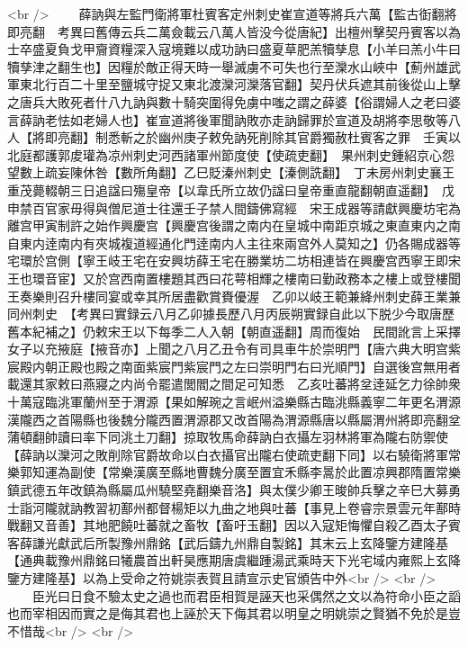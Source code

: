 <br />
　　薛訥與左監門衛將軍杜賓客定州刺史崔宣道等將兵六萬【監古衘翻將即亮翻　考異曰舊傳云兵二萬僉載云八萬人皆没今從唐紀】出檀州擊契丹賓客以為士卒盛夏負戈甲齎資糧深入寇境難以成功訥曰盛夏草肥羔犢孳息【小羊曰羔小牛曰犢孳津之翻生也】因糧於敵正得天時一舉滅虜不可失也行至灤水山峽中【薊州雄武軍東北行百二十里至鹽城守捉又東北渡灤河灤落官翻】契丹伏兵遮其前後從山上擊之唐兵大敗死者什八九訥與數十騎突圍得免虜中嗤之謂之薛婆【俗謂婦人之老曰婆言薛訥老怯如老婦人也】崔宣道將後軍聞訥敗亦走訥歸罪於宣道及胡將李思敬等八人【將即亮翻】制悉斬之於幽州庚子敕免訥死削除其官爵獨赦杜賓客之罪　壬寅以北庭都護郭䖍瓘為凉州刺史河西諸軍州節度使【使疏吏翻】　果州刺史鍾紹京心怨望數上疏妄陳休咎【數所角翻】乙巳貶溱州刺史【溱側詵翻】　丁未房州刺史襄王重茂薨輟朝三日追諡曰殤皇帝【以韋氏所立故仍諡曰皇帝重直龍翻朝直遥翻】　戊申禁百官家毋得與僧尼道士往還壬子禁人間鑄佛寫經　宋王成器等請獻興慶坊宅為離宫甲寅制許之始作興慶宫【興慶宫後謂之南内在皇城中南距京城之東直東内之南自東内逹南内有夾城複道經通化門逹南内人主往來兩宫外人莫知之】仍各賜成器等宅環於宫側【寧王岐王宅在安興坊薛王宅在勝業坊二坊相連皆在興慶宫西寧王即宋王也環音宦】又於宫西南置樓題其西曰花萼相輝之樓南曰勤政務本之樓上或登樓聞王奏樂則召升樓同宴或幸其所居盡歡賞賚優渥　乙卯以岐王範兼絳州刺史薛王業兼同州刺史　【考異曰實録云八月乙卯據長歷八月丙辰朔實録自此以下脱少今取唐歷舊本紀補之】仍敕宋王以下每季二人入朝【朝直遥翻】周而復始　民間訛言上采擇女子以充掖庭【掖音亦】上聞之八月乙丑令有司具車牛於崇明門【唐六典大明宫紫宸殿内朝正殿也殿之南面紫宸門紫宸門之左曰崇明門右曰光順門】自選後宫無用者載還其家敕曰燕寢之内尚令罷遣閭閻之間足可知悉　乙亥吐蕃將坌逹延乞力徐帥衆十萬寇臨洮軍蘭州至于渭源【果如解琬之言岷州溢樂縣古臨洮縣義寧二年更名渭源漢隴西之首陽縣也後魏分隴西置渭源郡又改首陽為渭源縣唐以縣屬渭州將即亮翻坌蒲頓翻帥讀曰率下同洮土刀翻】掠取牧馬命薛訥白衣攝左羽林將軍為隴右防禦使【薛訥以灤河之敗削除官爵故命以白衣攝官出隴右使疏吏翻下同】以右驍衛將軍常樂郭知運為副使【常樂漢廣至縣地曹魏分廣至置宜禾縣李暠於此置凉興郡隋置常樂鎮武德五年改鎮為縣屬瓜州驍堅堯翻樂音洛】與太僕少卿王晙帥兵擊之辛巳大募勇士詣河隴就訥教習初鄯州都督楊矩以九曲之地與吐蕃【事見上卷睿宗景雲元年鄯時戰翻又音善】其地肥饒吐蕃就之畜牧【畜吁玉翻】因以入寇矩悔懼自殺乙酉太子賓客薛謙光獻武后所製豫州鼎銘【武后鑄九州鼎自製銘】其末云上玄降鑒方建隆基【通典載豫州鼎銘曰犧農首出軒昊應期唐虞繼踵湯武乘時天下光宅域内雍熙上玄降鑒方建隆基】以為上受命之符姚崇表賀且請宣示史官頒告中外<br />
<br />
　　臣光曰日食不驗太史之過也而君臣相賀是誣天也采偶然之文以為符命小臣之謟也而宰相因而實之是侮其君也上誣於天下侮其君以明皇之明姚崇之賢猶不免於是豈不惜哉<br />
<br />

